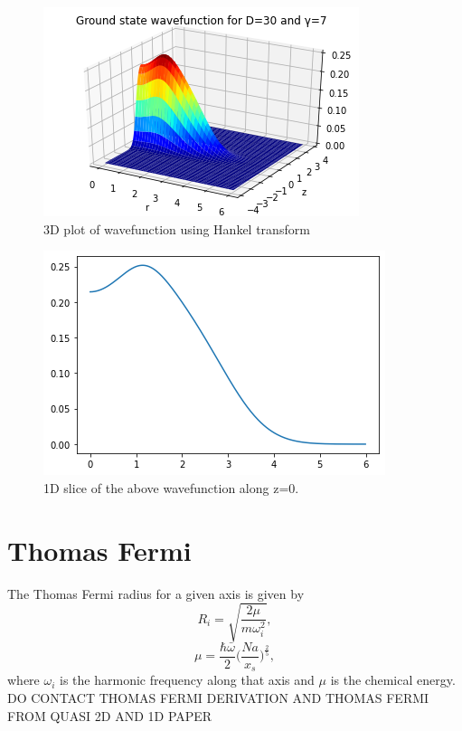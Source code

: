 \documentclass[10pt]{article}
\numberwithin{equation}{section}
\begin{document}
\begin{multicols}{2}
\begin{figure}[H]
\centering
\includegraphics[width=\linewidth]{redbloodcell1}
\caption{3D plot of wavefunction using Hankel transform}
\end{figure}


\begin{figure}[H]
\centering
\includegraphics[width=0.8\linewidth]{redbloodcell2}
\caption{1D slice of the above wavefunction along z=0.}
\end{figure}


\section{Thomas Fermi}
The Thomas Fermi radius for a given axis is given by 
\begin{equation}
R_{i} = \sqrt{\frac{2\mu}{m\omega_{i}^2}},
\end{equation}
\begin{equation}
\mu = \frac{\hbar\bar{\omega}}{2}\bigg(\frac{Na}{x_{s}}\bigg)^{\frac{2}{5}},
\end{equation}
where $\omega_{i}$ is the harmonic frequency along that axis and $\mu$ is the chemical energy. 
DO CONTACT THOMAS FERMI DERIVATION AND THOMAS FERMI FROM QUASI 2D AND 1D PAPER


\end{multicols}
\end{document}
